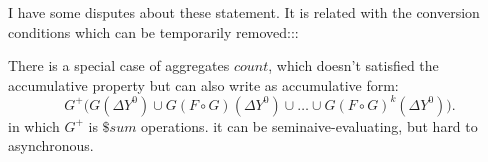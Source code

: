{\color{blue}
I have some disputes about these statement. It is related with the conversion conditions which can be temporarily removed:::	
	
	
There is a special case of aggregates $count$, which doesn't satisfied the accumulative property but can also write as accumulative form:
\begin{equation}
\label{eq:accumasyncres}
G^+\Big(G(\Delta Y^0)\cup G(F\circ G)(\Delta Y^0)\cup\ldots\cup G(F\circ G)^k(\Delta Y^0)\Big).
\end{equation}
in which $G^+$ is $\$sum$ operations. it can be seminaive-evaluating, but hard to asynchronous.
}



